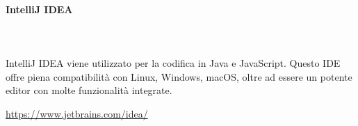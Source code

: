\paragraph{IntelliJ IDEA} \mbox{}\\ \mbox{}\\
IntelliJ IDEA viene utilizzato per la codifica in Java e JavaScript. Questo 
IDE offre piena compatibilità con Linux, Windows, macOS, oltre ad essere un 
potente editor con molte funzionalità integrate. \newline
\centerline{\url{https://www.jetbrains.com/idea/}}

